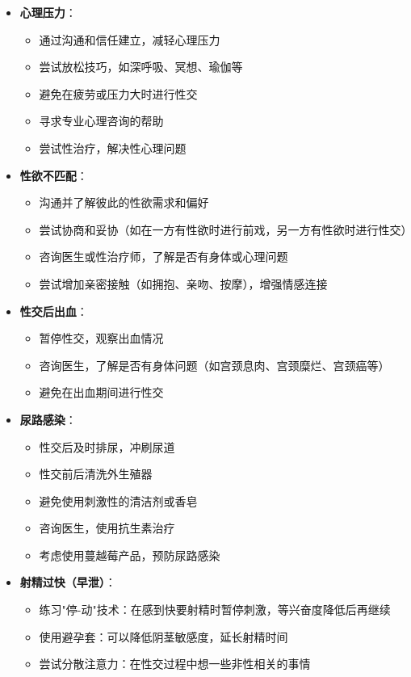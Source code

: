 \documentclass[12pt,UTF8]{ctexbook}
\begin{document}
\begin{itemize}
\begin{itemize}
		\item 考虑进行结扎手术（永久性避孕方法）
	\end{itemize}
	\item \textbf{心理压力}：
	\begin{itemize}
		\item 通过沟通和信任建立，减轻心理压力
		\item 尝试放松技巧，如深呼吸、冥想、瑜伽等
		\item 避免在疲劳或压力大时进行性交
		\item 寻求专业心理咨询的帮助
		\item 尝试性治疗，解决性心理问题
	\end{itemize}
	\item \textbf{性欲不匹配}：
	\begin{itemize}
		\item 沟通并了解彼此的性欲需求和偏好
		\item 尝试协商和妥协（如在一方有性欲时进行前戏，另一方有性欲时进行性交）
		\item 咨询医生或性治疗师，了解是否有身体或心理问题
		\item 尝试增加亲密接触（如拥抱、亲吻、按摩），增强情感连接
	\end{itemize}
	\item \textbf{性交后出血}：
	\begin{itemize}
		\item 暂停性交，观察出血情况
		\item 咨询医生，了解是否有身体问题（如宫颈息肉、宫颈糜烂、宫颈癌等）
		\item 避免在出血期间进行性交
	\end{itemize}
	\item \textbf{尿路感染}：
	\begin{itemize}
		\item 性交后及时排尿，冲刷尿道
		\item 性交前后清洗外生殖器
		\item 避免使用刺激性的清洁剂或香皂
		\item 咨询医生，使用抗生素治疗
		\item 考虑使用蔓越莓产品，预防尿路感染
	\end{itemize}
	\item \textbf{射精过快（早泄）}：
	\begin{itemize}
		\item 练习"停-动"技术：在感到快要射精时暂停刺激，等兴奋度降低后再继续
		\item 使用避孕套：可以降低阴茎敏感度，延长射精时间
		\item 尝试分散注意力：在性交过程中想一些非性相关的事情

\end{itemize}
\end{itemize}
\end{document}
